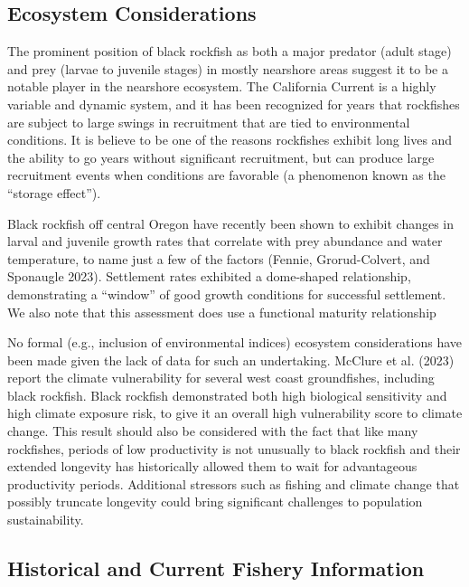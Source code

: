 \documentclass[11pt,
  english,
  letterpaper,
]{article}
\begin{document}
\hypertarget{ecosystem-considerations-1}{%
\subsection{Ecosystem Considerations}\label{ecosystem-considerations-1}}

The prominent position of black rockfish as both a major predator (adult stage) and prey (larvae to juvenile stages) in mostly nearshore areas suggest it to be a notable player in the nearshore ecosystem. The California Current is a highly variable and dynamic system, and it has been recognized for years that rockfishes are subject to large swings in recruitment that are tied to environmental conditions. It is believe to be one of the reasons rockfishes exhibit long lives and the ability to go years without significant recruitment, but can produce large recruitment events when conditions are favorable (a phenomenon known as the ``storage effect'').

Black rockfish off central Oregon have recently been shown to exhibit changes in larval and juvenile growth rates that correlate with prey abundance and water temperature, to name just a few of the factors (Fennie, Grorud-Colvert, and Sponaugle 2023). Settlement rates exhibited a dome-shaped relationship, demonstrating a ``window'' of good growth conditions for successful settlement. We also note that this assessment does use a functional maturity relationship

No formal (e.g., inclusion of environmental indices) ecosystem considerations have been made given the lack of data for such an undertaking. McClure et al. (2023) report the climate vulnerability for several west coast groundfishes, including black rockfish. Black rockfish demonstrated both high biological sensitivity and high climate exposure risk, to give it an overall high vulnerability score to climate change. This result should also be considered with the fact that like many rockfishes, periods of low productivity is not unusually to black rockfish and their extended longevity has historically allowed them to wait for advantageous productivity periods. Additional stressors such as fishing and climate change that possibly truncate longevity could bring significant challenges to population sustainability.

\hypertarget{historical-and-current-fishery-information}{%
\subsection{Historical and Current Fishery Information}\label{historical-and-current-fishery-information}}
\end{document}
